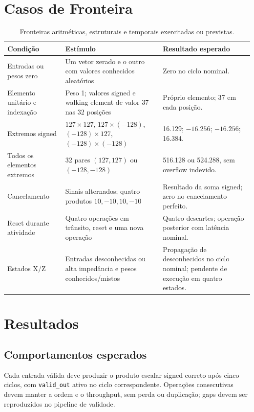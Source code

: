 \documentclass[12pt,a4paper]{article}
\begin{document}
\section{Casos de Fronteira}
\begin{table}[H]\centering\small
\begin{tabularx}{\textwidth}{p{4cm}Xp{5cm}}\toprule
\textbf{Condição} & \textbf{Estímulo} & \textbf{Resultado esperado}\\\midrule
Entradas ou pesos zero & Um vetor zerado e o outro com valores conhecidos aleatórios & Zero no ciclo nominal.\\
Elemento unitário e indexação & Peso 1; valores signed e walking element de valor 37 nas 32 posições & Próprio elemento; 37 em cada posição.\\
Extremos signed & $127\times127$, $127\times(-128)$, $(-128)\times127$, $(-128)\times(-128)$ & 16.129; $-16.256$; $-16.256$; 16.384.\\
Todos os elementos extremos & 32 pares $(127,127)$ ou $(-128,-128)$ & 516.128 ou 524.288, sem overflow indevido.\\
Cancelamento & Sinais alternados; quatro produtos $10,-10,10,-10$ & Resultado da soma signed; zero no cancelamento perfeito.\\
Reset durante atividade & Quatro operações em trânsito, reset e uma nova operação & Quatro descartes; operação posterior com latência nominal.\\
Estados X/Z & Entradas desconhecidas ou alta impedância e pesos conhecidos/mistos & Propagação de desconhecidos no ciclo nominal; pendente de execução em quatro estados.\\\bottomrule
\end{tabularx}
\caption{Fronteiras aritméticas, estruturais e temporais exercitadas ou previstas.}
\end{table}


\section{Resultados}
\subsection{Comportamentos esperados}
Cada entrada válida deve produzir o produto escalar signed correto após cinco ciclos, com \texttt{valid\_out} ativo no ciclo correspondente. Operações consecutivas devem manter a ordem e o throughput, sem perda ou duplicação; gaps devem ser reproduzidos no pipeline de validade.
\end{document}
